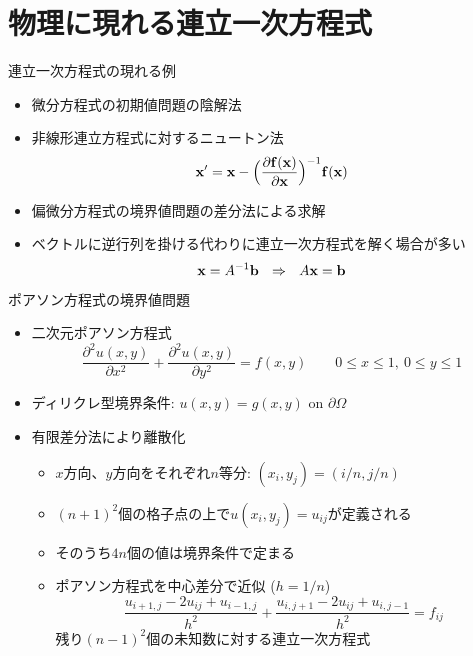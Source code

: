 \section{物理に現れる連立一次方程式}

\begin{frame}[t,fragile]{連立一次方程式の現れる例}
  \begin{itemize}
    \setlength{\itemsep}{1em}
  \item 微分方程式の初期値問題の陰解法
  \item 非線形連立方程式に対するニュートン法
    \[ {\bf x}' = {\bf x} - \Big( \frac{\partial {\bf f}({\bf x})}{\partial {\bf x}} \Big)^{-1} {\bf f}({\bf x}) \]
  \item 偏微分方程式の境界値問題の差分法による求解
  \item ベクトルに逆行列を掛ける代わりに連立一次方程式を解く場合が多い
    \[ {\bf x} = A^{-1} {\bf b} \ \ \Rightarrow \ \ A {\bf x} = {\bf b} \]
  \end{itemize}
\end{frame}

\begin{frame}[t,fragile]{ポアソン方程式の境界値問題}
  \begin{itemize}
    \setlength{\itemsep}{1em}
  \item 二次元ポアソン方程式
    \[ \frac{\partial^2 u(x,y)}{\partial x^2} + \frac{\partial^2 u(x,y)}{\partial y^2} = f(x,y) \qquad 0 \le x \le 1, \ 0 \le y \le 1\]
  \item ディリクレ型境界条件: $u(x,y) = g(x,y)$ on $\partial \Omega$
  \item 有限差分法により離散化
    \begin{itemize}
    \item $x$方向、$y$方向をそれぞれ$n$等分: $(x_i,y_j) = (i/n, j/n)$
    \item $(n+1)^2$個の格子点の上で$u(x_i,y_j)=u_{ij}$が定義される
    \item そのうち$4n$個の値は境界条件で定まる
    \item ポアソン方程式を中心差分で近似 ($h=1/n$)
      \[
      \frac{u_{i+1,j}-2u_{ij}+u_{i-1,j}}{h^2} + \frac{u_{i,j+1}-2u_{ij}+u_{i,j-1}}{h^2} = f_{ij}
      \]
      残り$(n-1)^2$個の未知数に対する連立一次方程式
    \end{itemize}
  \end{itemize}
\end{frame}

